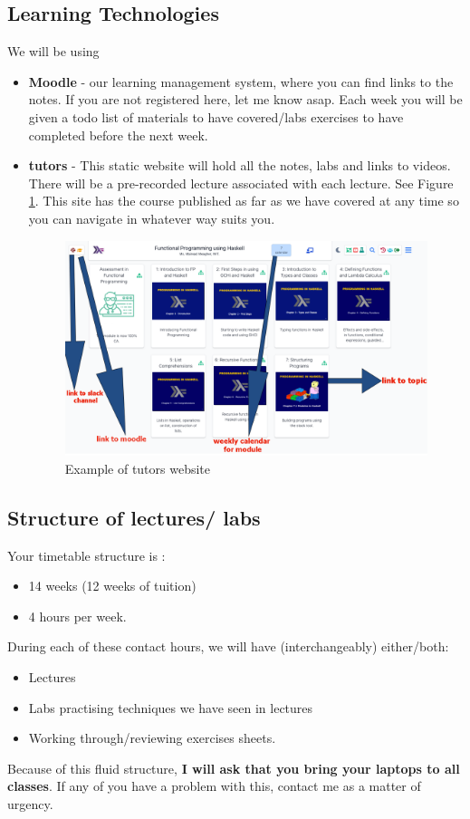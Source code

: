 \documentclass{article}
\begin{document}
\subsection{Learning Technologies}
We will be using 
\begin{itemize}
    \item \textbf{Moodle} - our learning management system, where you can find links to the notes. If you are not registered here, let me know asap.
Each week you will be given a todo list of materials to have covered/labs exercises 
to have completed before the next week. 
  


        \item \textbf{tutors} - This static website will hold all the notes, labs and links to videos. There will be a pre-recorded lecture associated with each lecture. See Figure \ref{tutors}.
    This site has the  course published as far as we have covered at any time so you can navigate in whatever way suits you.  
\begin{figure}[h]
    \centering
    \includegraphics[width=.5\textwidth]{img/tutors.png}
    \caption{Example of tutors website}
    \label{tutors}
\end{figure}


\end{itemize}
\pagebreak
\subsection{Structure of lectures/ labs}
Your timetable structure is : 
\begin{itemize}
\item 14 weeks (12 weeks of tuition)
\item 4 hours per week.
\end{itemize}
During each of these contact hours, we will have (interchangeably) either/both:
\begin{itemize}
    \item Lectures 
    \item Labs practising techniques we have seen in lectures
    \item Working through/reviewing exercises sheets. 
\end{itemize}
Because of this fluid structure, \textbf{I will ask that you bring your laptops to all classes}. If any of you have a problem with this, contact me as a matter of urgency. 
\end{document}
